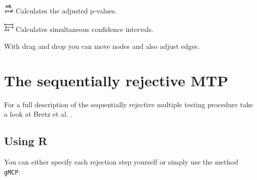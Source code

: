 \documentclass[a4paper, 11pt]{article}
\numberwithin{equation}{section}
\theoremstyle{definition}
\theoremstyle{plain}
\begin{document}
\includegraphics[width=0.5cm]{pictures/adjPval.png} Calculates the
adjusted p-values.

\includegraphics[width=0.5cm]{pictures/confint2.png} Calculates
simultaneous confidence intervals.

With drag and drop you can move nodes and also adjust edges.

\section{The sequentially rejective MTP}

For a full description of the sequentially rejective multiple testing
procedure take a look at Bretz et al. \cite{bretzEtAl2009graphical}. 

\subsection{Using R}

You can either specify each rejection step yourself or simply use the 
method \texttt{gMCP}:
\end{document}
